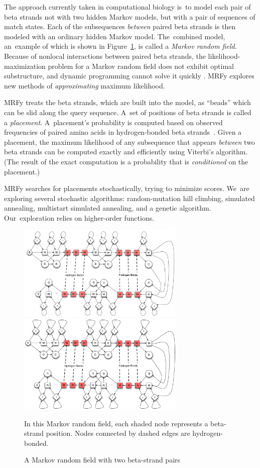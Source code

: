 \documentclass[preprint,nonatbib,blockstyle,nocopyrightspace,times]{sigplanconf}
\newcommand\figref[1]{Figure~\ref{#1}}
\let\cite\citep
\begin{document}
The approach currently taken in computational biology
is~to model each pair of beta strands not with two hidden Markov
models, 
but with a pair of sequences of match states.
Each of the subsequences \emph{between} paired beta strands is then
modeled with an ordinary hidden Markov model.
The~combined model, an~example of which is shown in \figref{mrf}, is called a
\textit{Markov random field}. 
Because of nonlocal interactions between paired beta strands, 
the likelihood-maximization problem for a Markov random field does not
 exhibit optimal substructure, and dynamic
 programming cannot solve it quickly \cite{Menke:2010ti,Daniels:2012}.
MRFy explores new methods of \emph{approximating}
maximum likelihood.




MRFy treats the beta 
strands, which are built into the model,
 as ``beads'' which can be slid along the query sequence.
A~set of positions of beta strands is called
 a \emph{placement}.
A~placement's probability is computed
based on observed frequencies of paired amino acids in 
hydrogen-bonded beta strands~\cite{Cowen:2002p588}.
Given a placement, the maximum likelihood of any subsequence that appears
\emph{between} two beta strands can be computed exactly and
efficiently using Viterbi's algorithm.
(The result of the exact computation is a probability that is
\emph{conditioned} on the placement.)

MRFy searches for placements stochastically,
trying to minimize scores.
We~are exploring several stochastic algorithms: random-mutation hill
climbing, simulated  
annealing, multistart simulated annealing, and a genetic algorithm.
Our~exploration relies on higher-order functions.


\begin{figure}
\ifpdfmadness
\centerline{\includegraphics[width=8cm]{mrf_interleave_diagram.pdf}} 
\else
\centerline{\includegraphics[width=8cm]{mrf_interleave_diagram.eps}} 
\fi
In this Markov random field,
each shaded node represents a beta-strand position.
Nodes connected by dashed edges are hydrogen-bonded.

\caption{A Markov random field with two beta-strand pairs}
\label{mrf} 
\end{figure}
\end{document}
